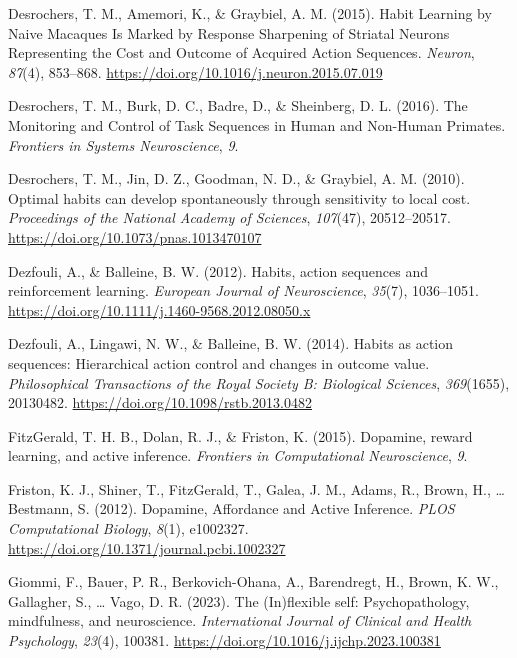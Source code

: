 \documentclass[
  man]{apa6}
\newlength{\cslhangindent}
\newlength{\cslentryspacingunit} %
\newenvironment{CSLReferences}[2] %
 {%
  \setlength{\parindent}{0pt}
  \ifodd #1
  \let\oldpar\par
  \def\par{\hangindent=\cslhangindent\oldpar}
  \fi
  \setlength{\parskip}{#2\cslentryspacingunit}
 }%
 {}
\begin{document}
\begin{CSLReferences}{1}{0}
\leavevmode{}%
Desrochers, T. M., Amemori, K., \& Graybiel, A. M. (2015). Habit {Learning} by {Naive Macaques Is Marked} by {Response Sharpening} of {Striatal Neurons Representing} the {Cost} and {Outcome} of {Acquired Action Sequences}. \emph{Neuron}, \emph{87}(4), 853--868. \url{https://doi.org/10.1016/j.neuron.2015.07.019}

\leavevmode{}%
Desrochers, T. M., Burk, D. C., Badre, D., \& Sheinberg, D. L. (2016). The {Monitoring} and {Control} of {Task Sequences} in {Human} and {Non-Human Primates}. \emph{Frontiers in Systems Neuroscience}, \emph{9}.

\leavevmode{}%
Desrochers, T. M., Jin, D. Z., Goodman, N. D., \& Graybiel, A. M. (2010). Optimal habits can develop spontaneously through sensitivity to local cost. \emph{Proceedings of the National Academy of Sciences}, \emph{107}(47), 20512--20517. \url{https://doi.org/10.1073/pnas.1013470107}

\leavevmode{}%
Dezfouli, A., \& Balleine, B. W. (2012). Habits, action sequences and reinforcement learning. \emph{European Journal of Neuroscience}, \emph{35}(7), 1036--1051. \url{https://doi.org/10.1111/j.1460-9568.2012.08050.x}

\leavevmode{}%
Dezfouli, A., Lingawi, N. W., \& Balleine, B. W. (2014). Habits as action sequences: Hierarchical action control and changes in outcome value. \emph{Philosophical Transactions of the Royal Society B: Biological Sciences}, \emph{369}(1655), 20130482. \url{https://doi.org/10.1098/rstb.2013.0482}

\leavevmode{}%
FitzGerald, T. H. B., Dolan, R. J., \& Friston, K. (2015). Dopamine, reward learning, and active inference. \emph{Frontiers in Computational Neuroscience}, \emph{9}.

\leavevmode{}%
Friston, K. J., Shiner, T., FitzGerald, T., Galea, J. M., Adams, R., Brown, H., \ldots{} Bestmann, S. (2012). Dopamine, {Affordance} and {Active Inference}. \emph{PLOS Computational Biology}, \emph{8}(1), e1002327. \url{https://doi.org/10.1371/journal.pcbi.1002327}

\leavevmode{}%
Giommi, F., Bauer, P. R., Berkovich-Ohana, A., Barendregt, H., Brown, K. W., Gallagher, S., \ldots{} Vago, D. R. (2023). The ({In})flexible self: {Psychopathology}, mindfulness, and neuroscience. \emph{International Journal of Clinical and Health Psychology}, \emph{23}(4), 100381. \url{https://doi.org/10.1016/j.ijchp.2023.100381}


\end{CSLReferences}
\end{document}
